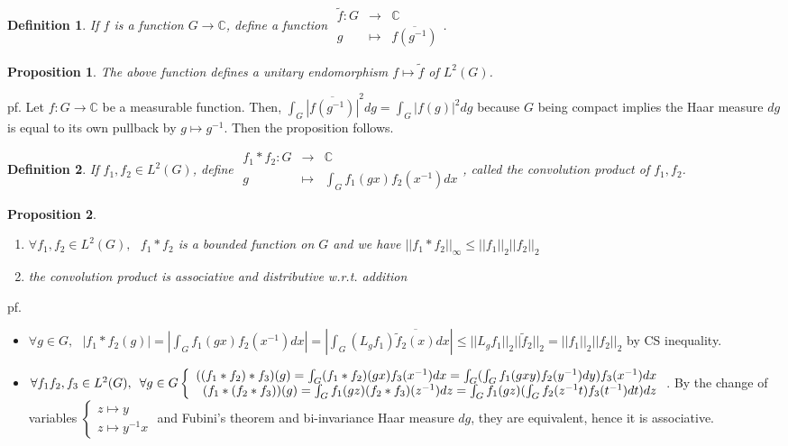 \documentclass[12pt,letterpaper]{report}
\newtheorem{definition}{Definition}[section]
\newtheorem{proposition}{Proposition}[section]
\begin{document}
\begin{definition}If $f$ is a function $G\rightarrow\mathbb{C}$, define a function $\begin{array}{rrr}\tilde{f}:G&\rightarrow&\mathbb{C}\\g&\mapsto&\overline{f(g^{-1})}\end{array}$.\end{definition}
\begin{proposition}The above function defines a unitary endomorphism $f\mapsto \tilde{f}$ of $L^{2}(G)$.\end{proposition}
pf. Let $f:G\rightarrow\mathbb{C}$ be a measurable function. Then, $\int_{G}\overline{|f(g^{-1})|}^{2}dg=\int_{G}|f(g)|^{2}dg$ because $G$ being compact implies the Haar measure $dg$ is equal to its own pullback by $g\mapsto g^{-1}$. Then the proposition follows. 
\begin{definition}If $f_{1},f_{2}\in L^{2}(G)$, define $\begin{array}{rrr}f_{1}*f_{2}:G&\rightarrow&\mathbb{C}\\g&\mapsto&\int_{G}f_{1}(gx)f_{2}(x^{-1})dx\end{array}$, called the convolution product of $f_{1},f_{2}$.\end{definition}
\begin{proposition}\begin{enumerate}\item $\forall f_{1},f_{2}\in L^{2}(G),\,\,\,\,f_{1}*f_{2}$ is a bounded function on $G$ and we have $||f_{1}*f_{2}||_{\infty}\leq||f_{1}||_{2}||f_{2}||_{2}$\item the convolution product is associative and distributive w.r.t. addition\end{enumerate}
\end{proposition}
pf.\begin{itemize}\item $\forall g\in G,\,\,\,\,|f_{1}*f_{2}(g)|=|\int_{G}f_{1}(gx)f_{2}(x^{-1})dx|=|\int_{G}(L_{g}f_{1})\overline{\tilde{f}_{2}(x)}dx|\leq||L_{g}f_{1}||_{2}||\tilde{f}_{2}||_{2}=||f_{1}||_{2}||f_{2}||_{2}$ by CS inequality. 
\item $\forall f_{1}f_{2},f_{3}\in L^{2}(G),\,\,\,\forall g\in G
\\\left\{\begin{array}{r}((f_{1}*f_{2})*f_{3})(g)=\int_{G}(f_{1}*f_{2})(gx)f_{3}(x^{-1})dx=\int_{G}(\int_{G}f_{1}(gxy)f_{2}(y^{-1})dy)f_{3}(x^{-1})dx\\(f_{1}*(f_{2}*f_{3}))(g)=\int_{G}f_{1}(gz)(f_{2}*f_{3})(z^{-1})dz=\int_{G}f_{1}(gz)(\int_{G}f_{2}(z^{-1}t)f_{3}(t^{-1})dt)dz\end{array}\right.$. By the change of variables $\left\{\begin{array}{r}z\mapsto y\\z\mapsto y^{-1}x\end{array}\right.$ and Fubini's theorem and bi-invariance Haar measure $dg$, they are equivalent, hence it is associative. 


\end{itemize}
\end{document}
